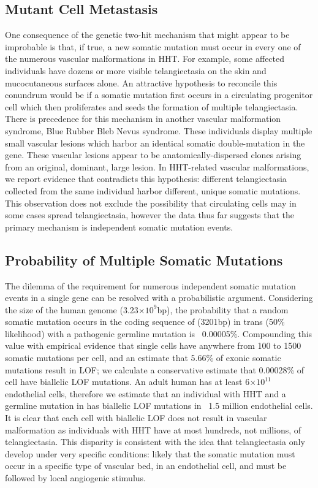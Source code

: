 \subsection{Mutant Cell Metastasis}
One consequence of the genetic two-hit mechanism that might appear to be improbable is that, if true, a new somatic mutation must occur in every one of the numerous vascular malformations in HHT. For example, some affected individuals have dozens or more visible telangiectasia on the skin and mucocutaneous surfaces alone.\citep{gonzalez2019, letteboer2008, plauchu1989}  An attractive hypothesis to reconcile this conundrum would be if a somatic mutation first occurs in a circulating progenitor cell which then proliferates and seeds the formation of multiple telangiectasia.  There is precedence for this mechanism in another vascular malformation syndrome, Blue Rubber Bleb Nevus syndrome.  These individuals display multiple small vascular lesions which harbor an identical somatic double-mutation in the  gene. These vascular lesions appear to be anatomically-dispersed clones arising from an original, dominant, large lesion.\citep{soblet2017} In HHT-related vascular malformations, we report evidence that contradicts this hypothesis: different telangiectasia collected from the same individual harbor different, unique somatic mutations. This observation does not exclude the possibility that circulating cells may in some cases spread telangiectasia, however the data thus far suggests that the primary mechanism is independent somatic mutation events. 

\subsection{Probability of Multiple Somatic Mutations}
The dilemma of the requirement for numerous independent somatic mutation events in a single gene can be resolved with a probabilistic argument. Considering the size of the human genome (3.23$\times$$10^9$bp), the probability that a random somatic mutation occurs in the coding sequence of  (3201bp) in trans (50\% likelihood) with a pathogenic  germline mutation is ~0.00005\%. Compounding this value with empirical evidence that single cells have anywhere from 100 to 1500 somatic mutations per cell\citep{milholland2017, lodato2015, losardo2017}, and an estimate that 5.66\% of exonic somatic mutations result in LOF\citep{milholland2017}; we calculate a conservative estimate that 0.00028\% of cell have biallelic LOF  mutations. An adult human has at least 6$\times$$10^{11}$ endothelial cells\citep{sender2016}, therefore we estimate that an individual with HHT and a germline mutation in  has biallelic LOF  mutations in ~1.5 million endothelial cells. It is clear that each cell with  biallelic LOF does not result in vascular malformation as individuals with HHT have at most hundreds, not millions, of telangiectasia. This disparity is consistent with the idea that telangiectasia only develop under very specific conditions: likely that the somatic mutation must occur in a specific type of vascular bed, in an endothelial cell, and must be followed by local angiogenic stimulus.  

